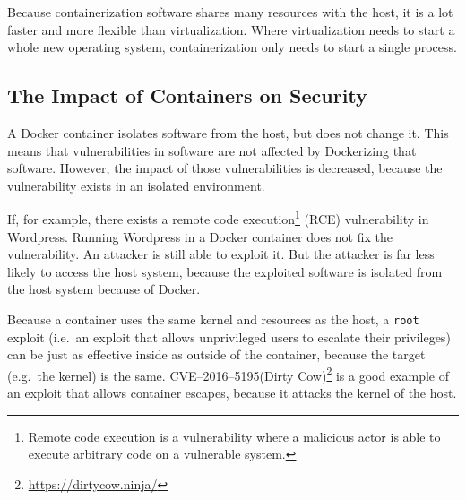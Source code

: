 Because containerization software shares many resources with the host, it is a lot faster and more flexible than virtualization. Where virtualization needs to start a whole new operating system, containerization only needs to start a single process.

\subsection{The Impact of Containers on Security}
A Docker container isolates software from the host, but does not change it. This means that vulnerabilities in software are not affected by Dockerizing that software. However, the impact of those vulnerabilities is decreased, because the vulnerability exists in an isolated environment.

If, for example, there exists a remote code execution\footnote{Remote code execution is a vulnerability where a malicious actor is able to execute arbitrary code on a vulnerable system.} (RCE) vulnerability in Wordpress. Running Wordpress in a Docker container does not fix the vulnerability. An attacker is still able to exploit it. But the attacker is far less likely to access the host system, because the exploited software is isolated from the host system because of Docker.

\medskip

Because a container uses the same kernel and resources as the host, a \lstinline{root} exploit (i.e.\ an exploit that allows unprivileged users to escalate their privileges) can be just as effective inside as outside of the container, because the target (e.g.\ the kernel) is the same. CVE--2016--5195(Dirty Cow)\footnote{\url{https://dirtycow.ninja/}} is a good example of an exploit that allows container escapes\cite{Dirty-Cow-Escape}, because it attacks the kernel of the host.
